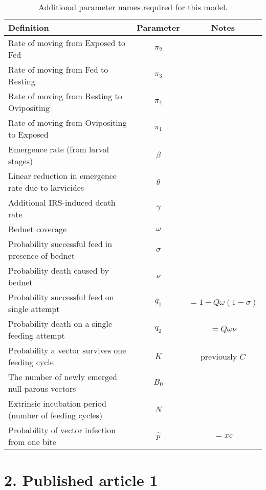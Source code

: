 \begin{table*}[h!]
\caption[Additional notation.]{Additional parameter names required for this model.}%
\vspace{.1cm}
\centering %
\begin{tabular}{l c c}%
\hline\hline                        %
Definition & Parameter & Notes \\ [0.5ex]%
\hline                  %
Rate of moving from Exposed to Fed & $\pi_2$ & \\
Rate of moving from Fed to Resting & $\pi_3$ & \\
Rate of moving from Resting to Ovipositing & $\pi_4$ & \\
Rate of moving from Ovipositing to Exposed & $\pi_1$ & \\
Emergence rate (from larval stages) & $\beta$ & \\
Linear reduction in emergence rate due to larvicides & $\theta$ & \\
Additional IRS-induced death rate & $\gamma$ & \\
Bednet coverage & $\omega$ & \\
Probability successful feed in presence of bednet & $\sigma$ & \\
Probability death caused by bednet & $\nu$ & \\
Probability successful feed on single attempt & $q_1$ & $=1-Q\omega(1-\sigma)$ \\
Probability death on a single feeding attempt & $q_2$ & $=Q\omega\nu$\\
Probability a vector survives one feeding cycle & $K$ & previously $C$\\
The number of newly emerged null-parous vectors & $B_0$ &\\
Extrinsic incubation period (number of feeding cycles) & $N$ & \\
Probability of vector infection from one bite & $\hat{p}$ & $=xc$ \\
\hline%
\end{tabular}
\label{table:param2}%
\end{table*}

\FloatBarrier

\section*{2. Published article 1}

